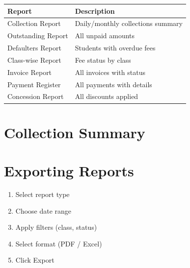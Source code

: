 \documentclass[12pt,a4paper]{report}
\begin{document}
\begin{longtable}{@{}p{4cm}p{9cm}@{}}
\toprule
\textbf{Report} & \textbf{Description} \\
\midrule
\endhead
Collection Report & Daily/monthly collections summary \\
Outstanding Report & All unpaid amounts \\
Defaulters Report & Students with overdue fees \\
Class-wise Report & Fee status by class \\
Invoice Report & All invoices with status \\
Payment Register & All payments with details \\
Concession Report & All discounts applied \\
\bottomrule
\end{longtable}

\section{Collection Summary}

\begin{center}
\end{center}

\section{Exporting Reports}

\begin{enumerate}[leftmargin=*]
    \item Select report type
    \item Choose date range
    \item Apply filters (class, status)
    \item Select format (PDF / Excel)
    \item Click Export
\end{enumerate}
\end{document}
